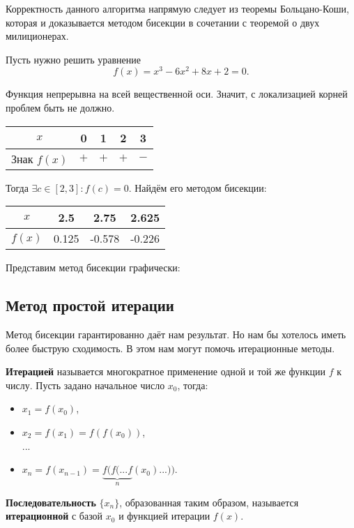 \documentclass[../main.tex]{subfile}
\begin{document}
Корректность данного алгоритма напрямую следует из теоремы Больцано-Коши, которая
и доказывается методом бисекции в сочетании с теоремой о двух милиционерах.

\begin{example}
	Пусть нужно решить уравнение
	\[f(x)=x^3-6x^2+8x+2=0.\]

	Функция непрерывна на всей вещественной оси. Значит, с локализацией
	корней проблем быть не должно.
	\newline

	\begin{tabular}{ |c|c|c|c|c| }
		\hline
		$x$		& 0	& 1	& 2	& 3 \\
		\hline
		Знак $f(x)$ 	& $+$	& $+$	& $+$	& $-$ \\
		\hline
	\end{tabular}
	\newline

	Тогда $\exists c\in[2,3]: f(c)=0$. Найдём его методом бисекции:
	\newline

	\begin{tabular}{*{4}{|c}|}
		\hline
		$x$ &	2.5	& 2.75	& 2.625 \\
		\hline
		$f(x)$ &0.125	& -0.578&-0.226 \\
		\hline
	\end{tabular}\leavevmode\newline

	Представим метод бисекции графически:
	\newline

	

\end{example}


\subsection{Метод простой итерации}

Метод бисекции гарантированно даёт нам результат. Но нам бы хотелось иметь
более быструю сходимость. В этом нам могут помочь итерационные методы.

\begin{define}
	\textbf{Итерацией} называется многократное применение одной и той же
	функции $f$ к числу. Пусть задано начальное число $x_0$, тогда:
	\begin{itemize}[noitemsep, nolistsep]
		\item $x_1=f(x_0)$,
		\item $x_2=f(x_1)=f(f(x_0))$,\\
		...
		\item $x_n=f(x_{n-1})=\underset{n}{\underbrace{f(f(...f}}
			(x_0)...))$.
	\end{itemize}

	\textbf{Последовательность} $\{x_n\}$, образованная таким образом,
	называется \textbf{итерационной} с базой $x_0$ и функцией итерации $f(x)$.
\end{define}
\end{document}
